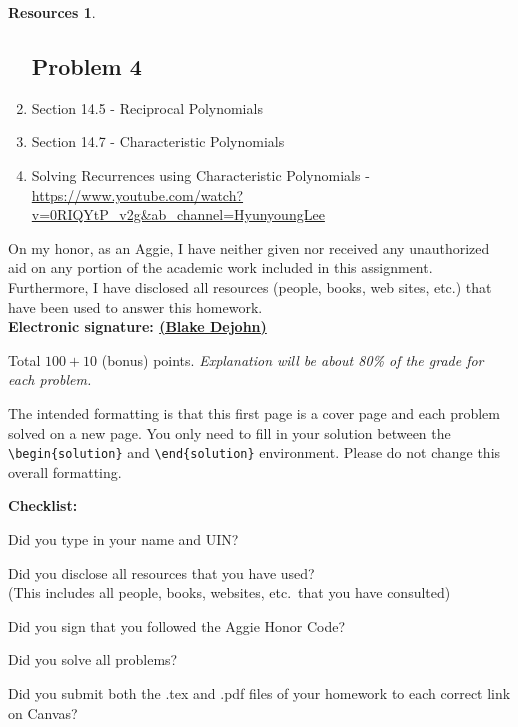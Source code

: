 \documentclass{article}
\theoremstyle{definition}
\newtheorem*{solution}{Solution}
\newtheorem*{resources}{Resources}
\newcommand{\honor}{\noindent On my honor, as an Aggie, I have neither
  given nor received any unauthorized aid on any portion of the
  academic work included in this assignment. Furthermore, I have
  disclosed all resources (people, books, web sites, etc.) that have
  been used to answer this homework. \\[2ex]
 \textbf{Electronic signature: \underline{ (Blake Dejohn) } } } %
\newcommand{\checklist}{\noindent\textbf{Checklist:}
\begin{compactitem}[$\Box$] 
\item [\checkmark] Did you type in your name and UIN? 
\item [\checkmark] Did you disclose all resources that you have used? \\
(This includes all people, books, websites, etc.\ that you have consulted)
\item [\checkmark] Did you sign that you followed the Aggie Honor Code? 
\item [\checkmark] Did you solve all problems? 
\item [\checkmark] Did you submit both the .tex and .pdf files of your homework to each correct link on Canvas? 
\end{compactitem}
}
\begin{document}
\begin{resources}
\begin{enumerate}
\subsection*{Problem 4}	
\item Section 14.5 - Reciprocal Polynomials
\item Section 14.7 - Characteristic Polynomials
\item Solving Recurrences using Characteristic Polynomials - \url{https://www.youtube.com/watch?v=0RIQYtP_v2g&ab_channel=HyunyoungLee}
\end{enumerate}
\end{resources}
\honor

\bigskip

\noindent
Total $100+10$ (bonus) points.  \textit{Explanation will be about 80\% of the grade for each problem.}

\bigskip

\noindent
The intended formatting is that this first page is a cover page and each 
problem solved on a new page. You only need to fill in your solution between 
the \verb|\begin{solution}| and \verb|\end{solution}| environment.  
Please do not change this overall formatting.

\bigskip

\vfill
\checklist
\end{document}

